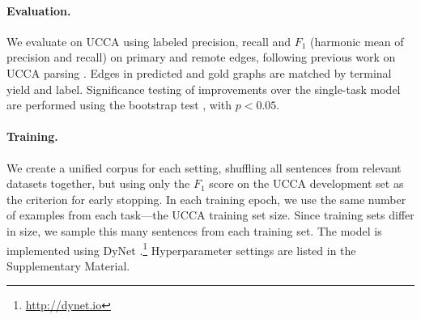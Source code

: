 \documentclass[11pt,a4paper]{article}
\newcommand{\oa}[1]{\footnote{\color{red}OA: #1}}
\DeclareMathOperator*{\argmax}{argmax}
\begin{document}
\paragraph{Evaluation.}

We evaluate on UCCA using labeled precision, recall and $F_1$ (harmonic mean of precision and recall)
on primary and remote edges,
following previous work on UCCA parsing \cite{hershcovich2017a}.
Edges in predicted and gold graphs are matched by terminal yield and label.
Significance testing of improvements over the single-task model are performed using the bootstrap test \cite{berg2012empirical},
with $p<0.05$.


\paragraph{Training.}

We create a unified corpus for each setting, shuffling all sentences from relevant datasets together,
but using only the $F_1$ score on the UCCA development set as the criterion for early stopping.
In each training epoch, we use the same number of examples from each task---the
UCCA training set size.
Since training sets differ in size, we sample this many sentences from each training set.
The model is implemented using DyNet \cite{neubig2017dynet}.\footnote{\url{http://dynet.io}}
Hyperparameter settings are listed in the Supplementary Material.

%
%
\end{document}
